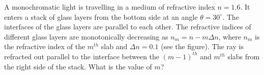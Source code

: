 
    \item A monochromatic light is travelling in a medium of refractive index $n = 1.6$. It enters a stack of glass layers from the bottom side at an angle $\theta = 30^{\circ}$. The interfaces of the glass layers are parallel to each other. The refractive indices of different glass layers are monotonically decreasing as $n_m = n - m\Delta n$, where $n_m$ is the refractive index of the $m^{th}$ slab and $\Delta n = 0.1$ (see the figure). The ray is refracted out parallel to the interface between the $(m - 1)^{th}$ and $m^{th}$ slabs from the right side of the stack. What is the value of $m$?

    \begin{center}
    \end{center}
